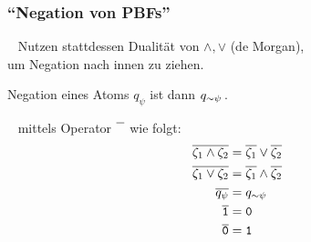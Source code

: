   \begin{frame}
    \frametitle{"`Negation von PBFs"'}
    
    ~ Nutzen stattdessen Dualität von $\land,\lor$ (de Morgan), \\
    um Negation nach innen zu ziehen.
    
    \parI
    Negation eines Atoms $q_\psi$ ist dann $q_{\mathord{\sim} \psi}$\,.
    
    \parIII
    ~ mittels Operator $\overline{\rule{0pt}{6pt}~~}$ wie folgt:
    \begin{align*}
      \overline{\zeta_1 \land \zeta_2} & = \overline{\zeta_1} \lor \overline{\zeta_2} \\
      \overline{\zeta_1 \lor \zeta_2}  & = \overline{\zeta_1} \land \overline{\zeta_2} \\
      \overline{q_\psi}                & = q_{\mathord{\sim}\psi} \\
      \overline{\texttt{1}}            & = \texttt{0} \\
      \overline{\texttt{0}}            & = \texttt{1}
    \end{align*}
    

  \end{frame}

